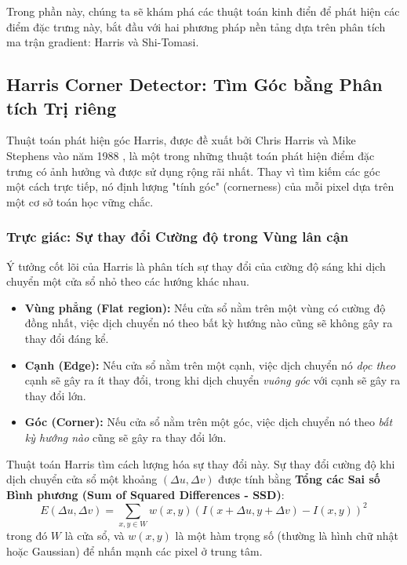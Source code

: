 Trong phần này, chúng ta sẽ khám phá các thuật toán kinh điển để phát hiện các điểm đặc trưng này, bắt đầu với hai phương pháp nền tảng dựa trên phân tích ma trận gradient: Harris và Shi-Tomasi.

\subsection{Harris Corner Detector: Tìm Góc bằng Phân tích Trị riêng}
\label{subsec:harris_corner_detector}

Thuật toán phát hiện góc Harris, được đề xuất bởi Chris Harris và Mike Stephens vào năm 1988 \cite{Harris1988}, là một trong những thuật toán phát hiện điểm đặc trưng có ảnh hưởng và được sử dụng rộng rãi nhất. Thay vì tìm kiếm các góc một cách trực tiếp, nó định lượng "tính góc" (cornerness) của mỗi pixel dựa trên một cơ sở toán học vững chắc.

\subsubsection{Trực giác: Sự thay đổi Cường độ trong Vùng lân cận}
\label{subsubsec:harris_intuition}
Ý tưởng cốt lõi của Harris là phân tích sự thay đổi của cường độ sáng khi dịch chuyển một cửa sổ nhỏ theo các hướng khác nhau.
\begin{itemize}
    \item \textbf{Vùng phẳng (Flat region):} Nếu cửa sổ nằm trên một vùng có cường độ đồng nhất, việc dịch chuyển nó theo bất kỳ hướng nào cũng sẽ không gây ra thay đổi đáng kể.
    \item \textbf{Cạnh (Edge):} Nếu cửa sổ nằm trên một cạnh, việc dịch chuyển nó \textit{dọc theo} cạnh sẽ gây ra ít thay đổi, trong khi dịch chuyển \textit{vuông góc} với cạnh sẽ gây ra thay đổi lớn.
    \item \textbf{Góc (Corner):} Nếu cửa sổ nằm trên một góc, việc dịch chuyển nó theo \textit{bất kỳ hướng nào} cũng sẽ gây ra thay đổi lớn.
\end{itemize}
Thuật toán Harris tìm cách lượng hóa sự thay đổi này. Sự thay đổi cường độ khi dịch chuyển cửa sổ một khoảng $(\Delta u, \Delta v)$ được tính bằng \textbf{Tổng các Sai số Bình phương (Sum of Squared Differences - SSD)}:
\begin{equation}
    E(\Delta u, \Delta v) = \sum_{x,y \in W} w(x, y) \left( I(x+\Delta u, y+\Delta v) - I(x, y) \right)^2
    \label{eq:ssd_harris}
\end{equation}
trong đó $W$ là cửa sổ, và $w(x, y)$ là một hàm trọng số (thường là hình chữ nhật hoặc Gaussian) để nhấn mạnh các pixel ở trung tâm.

